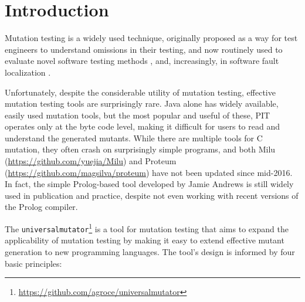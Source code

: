\section{Introduction}

Mutation testing \cite{PracProg,Mut2000} is a widely used technique,
originally proposed as a way for test engineers to understand
omissions in their testing, and now routinely used to evaluate
novel software testing methods \cite{ISSTA13,ahmed_testedness}, and, increasingly, in software
fault localization \cite{Metallaxis,multilingual,TransProgTest}.

Unfortunately, despite the considerable utility of mutation testing,
effective mutation testing tools are surprisingly rare.  Java alone
has widely available, easily used mutation tools, but the most popular
and useful of these, PIT \cite{pittest} operates only at the byte code
level, making it difficult for users to read and understand the
generated mutants.  While there are multiple tools for C mutation,
they often crash on surprisingly simple programs, and both Milu
(\url{https://github.com/yuejia/Milu}) and Proteum
(\url{https://github.com/magsilva/proteum}) have not been updated
since mid-2016.  In fact, the simple Prolog-based tool developed by
Jamie Andrews \cite{mutant} is still widely used in publication and
practice, despite not even working with recent versions of the Prolog compiler.

The {\tt universalmutator}\footnote{\url{https://github.com/agroce/universalmutator}} is a tool for
mutation testing \cite{PracProg,Mut2000} that aims to expand the
applicability of mutation testing by making it easy to extend
effective mutant generation to new programming languages.
The tool's design is informed by four basic principles:

